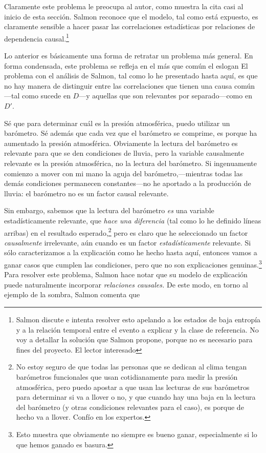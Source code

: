 Claramente este problema le preocupa al autor, como muestra
la cita casi al inicio de esta sección. Salmon reconoce que
el modelo, tal como está expuesto, es claramente sensible a
hacer pasar las correlaciones estadísticas por relaciones
de dependencia causal.\footnote{
  Salmon discute e intenta resolver esto apelando a los
  estados de baja entropía y a la relación temporal entre el
  evento a explicar y la clase de referencia. No voy a
  detallar la solución que Salmon propone,	porque no es
  necesario para fines del proyecto. El lector	interesado
}

Lo anterior es básicamente una forma de retratar un problema
más general. En forma condensada, este problema se refleja
en el más que común el eslogan  El problema con el análisis de Salmon, tal como
lo he presentado hasta aquí, es que no hay manera de
distinguir entre las correlaciones que tienen una causa
común---tal como sucede en $D$---y aquellas que son
relevantes por separado---como en $D'$.

Sé que para determinar cuál es la presión atmosférica, puedo
utilizar un barómetro. Sé además que cada vez que el
barómetro se comprime, es porque ha aumentado la presión
atmosférica. Obviamente la lectura del barómetro es
relevante para que se den condiciones de lluvia, pero la
variable causalmente relevante es la presión atmosférica, no
la lectura del barómetro. Si ingenuamente comienzo a mover
con mi mano la aguja del barómetro,---mientras todas las
demás condiciones permanecen constantes---no
he aportado a la producción de lluvia: el barómetro no es un
factor causal relevante.

Sin embargo, sabemos que la lectura del barómetro \emph{es}
una variable estadísticamente relevante, que \emph{hace una
diferencia} (tal como lo he definido líneas arribas) en el
resultado esperado,\footnote{
  No estoy seguro de que todas las personas que se dedican
  al clima tengan barómetros funcionales que usan
  cotidianamente para medir la presión atmosférica, pero
  puedo	apostar a que usan las lecturas de sus barómetros
  para determinar si va a llover o no, y que cuando hay una
  baja en la lectura del barómetro (y otras condiciones
  relevantes para el caso), es porque de	hecho va a llover.
  Confío en los expertos.
}
pero es claro que he seleccionado un factor
\emph{causalmente} irrelevante, aún cuando es un factor
\emph{estadísticamente} relevante. Si sólo caracterizamos a
la explicación como he hecho hasta aquí, entonces vamos a
ganar casos que cumplen las condiciones, pero que no son
explicaciones genuinas.\footnote{
	Esto muestra que obviamente no siempre es bueno ganar,
	especialmente si lo que hemos ganado es basura.
}
Para resolver este problema, Salmon hace notar que su modelo
de explicación puede naturalmente incorporar
\emph{relaciones causales.} De este modo, en torno al
ejemplo de la sombra, Salmon comenta que

